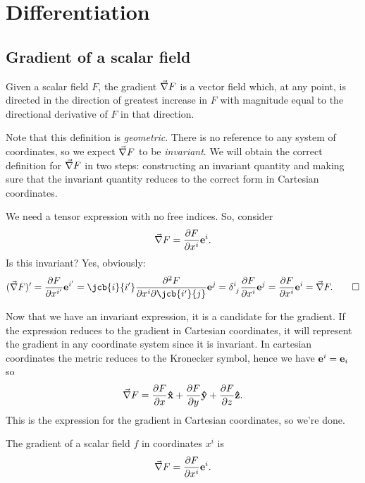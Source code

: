 \documentclass{article}
\begin{document}
	\section{Differentiation}
	\subsection{Gradient of a scalar field}
	\begin{definition}
		Given a scalar field $ F $, the gradient $ \vec{\nabla} F $ is a vector field which, at any point, is directed in the direction of greatest increase in $ F $ with magnitude equal to the directional derivative of $ F $ in that direction.
	\end{definition}
	Note that this definition is \textit{geometric}. There is no reference to any system of coordinates, so we expect $ \vec{\nabla} F $ to be \textit{invariant}. We will obtain the correct definition for $ \vec{\nabla} F $ in two steps: constructing an invariant quantity and making sure that the invariant quantity reduces to the correct form in Cartesian coordinates.
	
	\begin{proposition}
		We need a tensor expression with no free indices. So, consider
		\[
		\vec{\nabla} F = \pdv{F}{x^{i}} \vb{e}^{i}.
		\]
		Is this invariant? Yes, obviously:
		\[
		(\grad{F})^\prime = \pdv{F}{x^{i^\prime}} \vb{e}^{i^\prime} = \jcb{i}{i^\prime} \pdv{F}{x^{i}} \jcb{i^\prime}{j} \vb{e}^{j} = \delta\indices{^{i}_{j}} \pdv{F}{x^{i}} \vb{e}^{j} 
		= \pdv{F}{x^{i}} \vb{e}^{i} 
		= \grad{F}. \qed 
		\]
	\end{proposition}
	\begin{proposition}
		Now that we have an invariant expression, it is a candidate for the gradient. If the expression reduces to the gradient in Cartesian coordinates, it will represent the gradient in any coordinate system since it is invariant. In cartesian coordinates the metric reduces to the Kronecker symbol, hence we have $ \vb{e}^{i} = \vb{e}_{i} $ so
		\[
		\vec{\nabla} F = \pdv{F}{x} \vb{\hat{x}} + \pdv{F}{y} \vb{\hat{y}} +\pdv{F}{z} \vb{\hat{z}}.
		\]
		This is the expression for the gradient in Cartesian coordinates, so we're done.
	\end{proposition}
	\begin{definition}
		The gradient of a scalar field $ f $ in coordinates $ x^{i} $ is
		\begin{equation}
			\vec{\nabla} F = \pdv{F}{x^{i}} \vb{e}^{i}.
		\end{equation}
	\end{definition}
\end{document}
